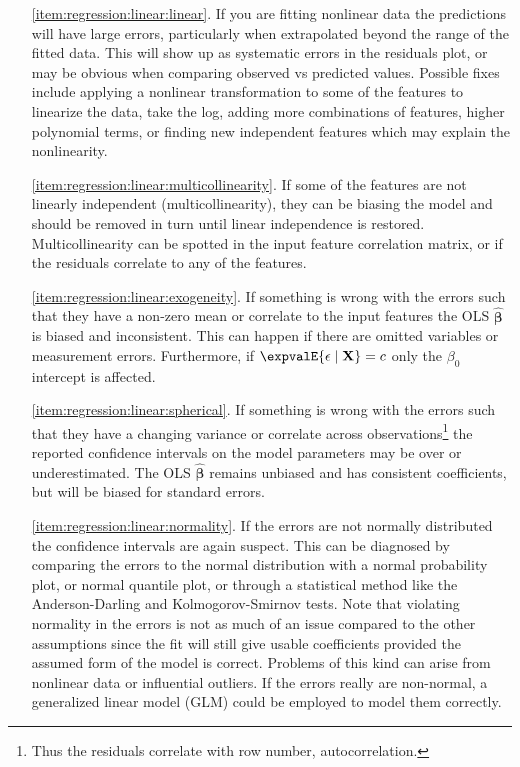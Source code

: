 \begin{itemize}[noitemsep]
  \item[\cref{item:regression:linear:linear}.] If you are fitting nonlinear data the predictions will have large errors,
particularly when extrapolated beyond the range of the fitted data.
This will show up as systematic errors in the residuals plot,
or may be obvious when comparing observed vs predicted values.
Possible fixes include applying a nonlinear transformation to some of the features to linearize the data, \eg take the log,
adding more combinations of features, \eg higher polynomial terms,
or finding new independent features which may explain the nonlinearity.

  \item[\cref{item:regression:linear:multicollinearity}.] If some of the features are not linearly independent (multicollinearity),
they can be biasing the model and should be removed in turn until linear independence is restored.
Multicollinearity can be spotted in the input feature correlation matrix,
or if the residuals correlate to any of the features.

  \item[\cref{item:regression:linear:exogeneity}.] If something is wrong with the errors
such that they have a non-zero mean or correlate to the input features
the OLS $\hat{\bm{\beta}}$ is biased and inconsistent.
This can happen if there are omitted variables or measurement errors.
Furthermore, if $\expvalE{\epsilon \mid \mathbf{X}} = c$ only the $\beta_{0}$ intercept is affected.

  \item[\cref{item:regression:linear:spherical}.] If something is wrong with the errors
such that they have a changing variance or correlate across observations\footnote{Thus the residuals correlate with row number, \ie autocorrelation.}
the reported confidence intervals on the model parameters may be over or underestimated.
The OLS $\hat{\bm{\beta}}$ remains unbiased and has consistent coefficients, but will be biased for standard errors.

  \item[\cref{item:regression:linear:normality}.] If the errors are not normally distributed the confidence intervals are again suspect.
This can be diagnosed by comparing the errors to the normal distribution with a normal probability plot, or normal quantile plot,
or through a statistical method like the Anderson-Darling and Kolmogorov-Smirnov tests.
Note that violating normality in the errors is not as much of an issue compared to the other assumptions
since the fit will still give usable coefficients provided the assumed form of the model is correct.
Problems of this kind can arise from nonlinear data or influential outliers.
If the errors really are non-normal, a generalized linear model (GLM) could be employed to model them correctly.
\end{itemize}

